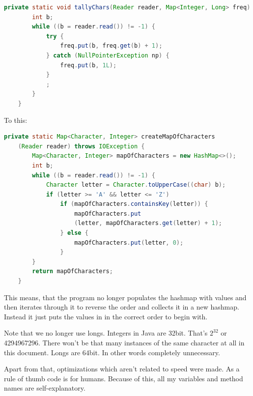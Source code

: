 \documentclass[a4paper, 12pt]{report}
\begin{document}
\begin{lstlisting}[language=java]
 private static void tallyChars(Reader reader, Map<Integer, Long> freq) throws IOException {
        int b;
        while ((b = reader.read()) != -1) {
            try {
                freq.put(b, freq.get(b) + 1);
            } catch (NullPointerException np) {
                freq.put(b, 1L);
            }
            ;
        }
    }

\end{lstlisting}

To this:
\begin{lstlisting}[language=java]
    private static Map<Character, Integer> createMapOfCharacters
    (Reader reader) throws IOException {
        Map<Character, Integer> mapOfCharacters = new HashMap<>();
        int b;
        while ((b = reader.read()) != -1) {
            Character letter = Character.toUpperCase((char) b);
            if (letter >= 'A' && letter <= 'Z')
                if (mapOfCharacters.containsKey(letter)) {
                    mapOfCharacters.put
                    (letter, mapOfCharacters.get(letter) + 1);
                } else {
                    mapOfCharacters.put(letter, 0);
                }
        }
        return mapOfCharacters;
    }
\end{lstlisting}

This means, that the program no longer populates the hashmap with values and then iterates through it to reverse the order and collects it in a new hashmap. Instead it just puts the values in in the correct order to begin with.

Note that we no longer use longs. Integers in Java are 32bit. That's $2^{32}$ or 4294967296. There won't be that many instances of the same character at all in this document. Longs are 64bit. In other words completely unnecessary. 

Apart from that, optimizations which aren't related to speed were made. As a rule of thumb code is for humans. Because of this, all my variables and method names are self-explanatory. 
\end{document}
